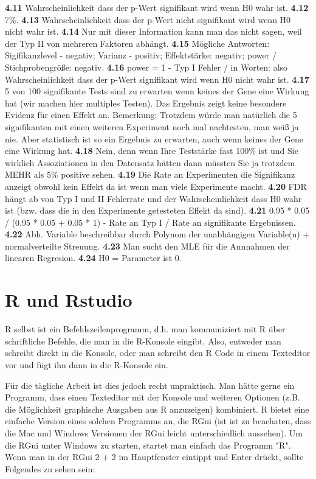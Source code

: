 \documentclass[a4paper,twoside]{tufte-book}\usepackage[]{graphicx}\usepackage[]{color}
\begin{document}
\begin{appendices}
\begin{fullwidth}
\textbf{4.11} Wahrscheinlichkeit dass der p-Wert signifikant wird wenn H0 wahr ist.
\textbf{4.12} 7\%.
\textbf{4.13} Wahrscheinlichkeit dass der p-Wert nicht signifikant wird wenn H0 nicht wahr ist.
\textbf{4.14} Nur mit dieser Information kann man das nicht sagen, weil der Typ II von mehreren Faktoren abhängt.
\textbf{4.15} Mögliche Antworten: Sigifikanzlevel - negativ; Varianz - positiv; Effektstärke: negativ; power / Stichprobengröße: negativ.
\textbf{4.16} power = 1 - Typ I Fehler / in Worten: also Wahrscheinlichkeit dass der p-Wert signifikant wird wenn H0 nicht wahr ist.
\textbf{4.17} 5 von 100 signifikante Tests sind zu erwarten wenn keines der Gene eine Wirkung hat (wir machen hier multiples Testen). Das Ergebnis zeigt keine besondere Evidenz für einen Effekt an. Bemerkung: Trotzdem würde man natürlich die 5 signifikanten mit einen weiteren Experiment noch mal nachtesten, man weiß ja nie. Aber statistisch ist so ein Ergebnis zu erwarten, auch wenn keines der Gene eine Wirkung hat.
\textbf{4.18} Nein, denn wenn Ihre Teststärke fast 100\% ist und Sie wirklich Assoziationen in den Datensatz hätten dann müssten Sie ja trotzdem MEHR als 5\% positive sehen.
\textbf{4.19} Die Rate an Experimenten die Signifikanz anzeigt obwohl kein Effekt da ist wenn man viele Experimente macht.
\textbf{4.20} FDR hängt ab von Typ I und II Fehlerrate und der Wahrscheinlichkeit dass H0 wahr ist (bzw. dass die in den Experimente getesteten Effekt da sind).
\textbf{4.21} 0.95 * 0.05 / (0.95 * 0.05 + 0.05 * 1) - Rate an Typ I / Rate an signifikante Ergebnissen.
\textbf{4.22} Abh. Variable beschreibbar durch Polynom der unabhängigen Variable(n) + normalverteilte Streuung.
\textbf{4.23} Man sucht den MLE für die Annnahmen der linearen Regresion.
\textbf{4.24} H0 = Parameter ist 0.

\end{fullwidth}

\chapter{R und Rstudio}

R selbst ist ein Befehlszeilenprogramm, d.h. man kommuniziert mit R über schriftliche Befehle, die man in die R-Konsole eingibt. Also, entweder man schreibt direkt in die Konsole, oder man schreibt den R Code in einem Texteditor vor und fügt ihn dann in die R-Konsole ein.

Für die tägliche Arbeit ist dies jedoch recht unpraktisch. Man hätte gerne ein Programm, dass einen Texteditor mit der Konsole und weiteren Optionen (z.B. die Möglichkeit graphische Ausgaben aus R anzuzeigen) kombiniert. R bietet eine einfache Version eines solchen Programms an, die RGui (ist ist zu beachaten, dass die Mac und Windows Versionen der RGui leicht unterschiedlich aussehen).  Um die RGui unter Windows zu starten, startet man einfach das Programm "R". Wenn man in der RGui 2 + 2 im Hauptfenster eintippt und Enter drückt, sollte Folgendes zu sehen sein:


\end{appendices}
\end{document}
